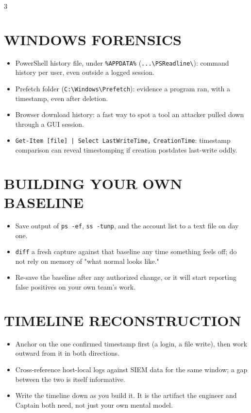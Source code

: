 \documentclass[7pt,landscape]{article}
\begin{document}
\begin{multicols*}{3}
\section{\textcolor{winc}{WINDOWS FORENSICS}}
\begin{itemize}
    \item PowerShell history file, under \texttt{\%APPDATA\%} \newline (\texttt{...\textbackslash PSReadline\textbackslash}): command history per user, even outside a logged session.
    \item Prefetch folder (\texttt{C:\textbackslash Windows\textbackslash Prefetch}): evidence a program ran, with a timestamp, even after deletion.
    \item Browser download history: a fast way to spot a tool an attacker pulled down through a GUI session.
    \item \texttt{Get-Item [file] | Select LastWriteTime,} \newline \texttt{CreationTime}: timestamp comparison can reveal timestomping if creation postdates last-write oddly.
\end{itemize}

\section{BUILDING YOUR OWN BASELINE}
\begin{itemize}
    \item Save output of \texttt{ps -ef}, \texttt{ss -tunp}, and the account list to a text file on day one.
    \item \texttt{diff} a fresh capture against that baseline any time something feels off; do not rely on memory of "what normal looks like."
    \item Re-save the baseline after any authorized change, or it will start reporting false positives on your own team's work.
\end{itemize}

\section{TIMELINE RECONSTRUCTION}
\begin{itemize}
    \item Anchor on the one confirmed timestamp first (a login, a file write), then work outward from it in both directions.
    \item Cross-reference host-local logs against SIEM data for the same window; a gap between the two is itself informative.
    \item Write the timeline down as you build it. It is the artifact the engineer and Captain both need, not just your own mental model.
\end{itemize}


\end{multicols*}
\end{document}
